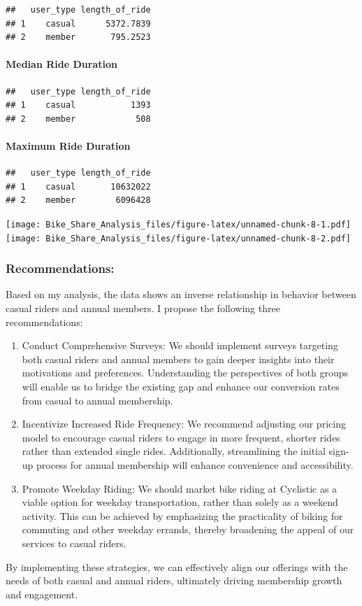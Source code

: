 \documentclass[
]{article}
\begin{document}
\begin{verbatim}
##   user_type length_of_ride
## 1    casual      5372.7839
## 2    member       795.2523
\end{verbatim}

\paragraph{Median Ride Duration}\label{median-ride-duration}

\begin{verbatim}
##   user_type length_of_ride
## 1    casual           1393
## 2    member            508
\end{verbatim}

\paragraph{Maximum Ride Duration}\label{maximum-ride-duration}

\begin{verbatim}
##   user_type length_of_ride
## 1    casual       10632022
## 2    member        6096428
\end{verbatim}

\texttt{[image: Bike\_Share\_Analysis\_files/figure-latex/unnamed-chunk-8-1.pdf]}
\texttt{[image: Bike\_Share\_Analysis\_files/figure-latex/unnamed-chunk-8-2.pdf]}

\subsubsection{Recommendations:}\label{recommendations}

Based on my analysis, the data shows an inverse relationship in behavior
between casual riders and annual members. I propose the following three
recommendations:

\begin{enumerate}
\def\labelenumi{\arabic{enumi}.}
\item
  Conduct Comprehensive Surveys: We should implement surveys targeting
  both casual riders and annual members to gain deeper insights into
  their motivations and preferences. Understanding the perspectives of
  both groups will enable us to bridge the existing gap and enhance our
  conversion rates from casual to annual membership.
\item
  Incentivize Increased Ride Frequency: We recommend adjusting our
  pricing model to encourage casual riders to engage in more frequent,
  shorter rides rather than extended single rides. Additionally,
  streamlining the initial sign-up process for annual membership will
  enhance convenience and accessibility.
\item
  Promote Weekday Riding: We should market bike riding at Cyclistic as a
  viable option for weekday transportation, rather than solely as a
  weekend activity. This can be achieved by emphasizing the practicality
  of biking for commuting and other weekday errands, thereby broadening
  the appeal of our services to casual riders.
\end{enumerate}

By implementing these strategies, we can effectively align our offerings
with the needs of both casual and annual riders, ultimately driving
membership growth and engagement.
\end{document}
